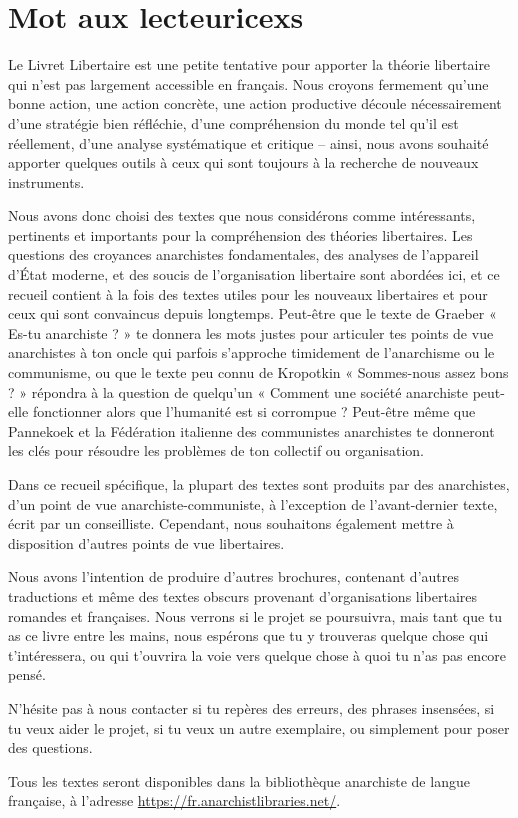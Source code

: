 \chapter*{Mot aux lecteuricexs}

Le Livret Libertaire est une petite tentative pour apporter la théorie libertaire qui n'est pas largement accessible en français. Nous croyons fermement qu'une bonne action, une action concrète, une action productive découle nécessairement d'une stratégie bien réfléchie, d'une compréhension du monde tel qu'il est réellement, d'une analyse systématique et critique -- ainsi, nous avons souhaité apporter quelques outils à ceux qui sont toujours à la recherche de nouveaux instruments.

Nous avons donc choisi des textes que nous considérons comme intéressants, pertinents et importants pour la compréhension des théories libertaires. Les questions des croyances anarchistes fondamentales, des analyses de l'appareil d'État moderne, et des soucis de l'organisation libertaire sont abordées ici, et ce recueil contient à la fois des textes utiles pour les nouveaux libertaires et pour ceux qui sont convaincus depuis longtemps. Peut-être que le texte de Graeber « Es-tu anarchiste ? » te donnera les mots justes pour articuler tes points de vue anarchistes à ton oncle qui parfois s’approche timidement de l’anarchisme ou le communisme, ou que le texte peu connu de Kropotkin « Sommes-nous assez bons ? » répondra à la question de quelqu'un « Comment une société anarchiste peut-elle fonctionner alors que l'humanité est si corrompue ? Peut-être même que Pannekoek et la Fédération italienne des communistes anarchistes te donneront les clés pour résoudre les problèmes de ton collectif ou organisation.

Dans ce recueil spécifique, la plupart des textes sont produits par des anarchistes, d'un point de vue anarchiste-communiste, à l'exception de l'avant-dernier texte, écrit par un conseilliste. Cependant, nous souhaitons également mettre à disposition d'autres points de vue libertaires.

Nous avons l'intention de produire d'autres brochures, contenant d'autres traductions et même des textes obscurs provenant d'organisations libertaires romandes et françaises. Nous verrons si le projet se poursuivra, mais tant que tu as ce livre entre les mains, nous espérons que tu y trouveras quelque chose qui t’intéressera, ou qui t’ouvrira la voie vers quelque chose à quoi tu n’as pas encore pensé.

N’hésite pas à nous contacter si tu repères des erreurs, des phrases insensées, si tu veux aider le projet, si tu veux un autre exemplaire, ou simplement pour poser des questions.

Tous les textes seront disponibles dans la bibliothèque anarchiste de langue française, à l'adresse \url{https://fr.anarchistlibraries.net/}.


